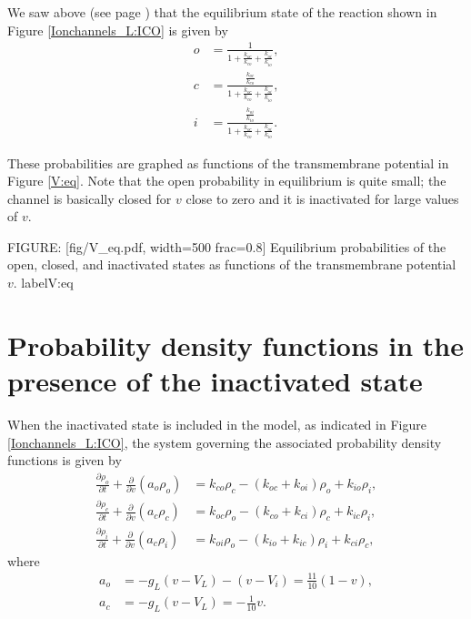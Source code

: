 
We saw above (see page \pageref{eq_prob_ioc}) that the  equilibrium state of the
reaction shown in Figure  \ref{Ionchannels_L:ICO} is given by
\begin{align*}
o  &  =\frac{1}{1+\frac{k_{oc}}{k_{co}}+\frac{k_{oi}}{k_{io}}},\\
c  &  =\frac{\frac{k_{oc}}{k_{co}}}{1+\frac{k_{oc}}{k_{co}}+\frac{k_{oi}
}{k_{io}}},\\
i  &  =\frac{\frac{k_{oi}}{k_{io}}}{1+\frac{k_{oc}}{k_{co}}+\frac{k_{oi}
}{k_{io}}}.
\end{align*}


These probabilities are graphed as functions of the transmembrane potential in Figure
\ref{V:eq}. Note that the open probability in equilibrium is quite small; the channel is basically closed
for $v$ close to zero and it is inactivated for large values of $v$.

FIGURE: [fig/V_eq.pdf, width=500 frac=0.8] Equilibrium probabilities of the open, closed, and inactivated states as functions of the transmembrane potential $v$. label{V:eq}

\section{Probability density functions in the presence of the inactivated
state \label{pdfi}}

When the inactivated state is included in the model, as indicated in Figure  \ref{Ionchannels_L:ICO},
 the system governing the associated probability density functions is given by
\begin{align}
\frac{\partial\rho_{o}}{\partial t}+\frac{\partial}{\partial v}\left(
a_{o}\rho_{o}\right)   &  =k_{co}\rho_{c}-(k_{oc}+k_{oi})\rho_{o}+k_{io}
\rho_{i},\label{vpdfi1}\\
\frac{\partial\rho_{c}}{\partial t}+\frac{\partial}{\partial v}\left(
a_{c}\rho_{c}\right)   &  =k_{oc}\rho_{o}-(k_{co}+k_{ci})\rho_{c}+k_{ic}
\rho_{i},\label{vpdfi2}\\
\frac{\partial\rho_{i}}{\partial t}+\frac{\partial}{\partial v}\left(
a_{c}\rho_{i}\right)   &  =k_{oi}\rho_{o}-(k_{io}+k_{ic})\rho_{i}+k_{ci}
\rho_{c}\label{vpdfi3},
\end{align}
where
\begin{align}
a_{o}  &  =-g_{L}\left(  v-V_{L}\right)  -(v-V_{i})=\frac{11}{10}\left(
1-v\right)  ,\label{vfluxi}\\
a_{c}  &  =-g_{L}\left(  v-V_{L}\right)  =-\frac{1}{10}v.\nonumber
\end{align}


